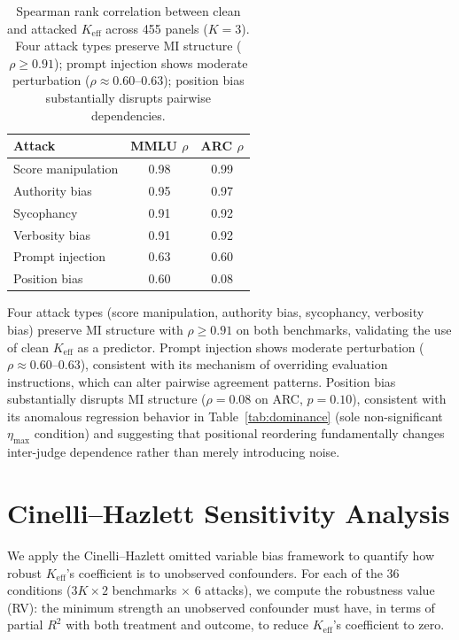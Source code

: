 \begin{table}[h]
\centering
\small
\begin{tabular}{lcc}
\toprule
\textbf{Attack} & \textbf{MMLU $\rho$} & \textbf{ARC $\rho$} \\
\midrule
Score manipulation & 0.98 & 0.99 \\
Authority bias     & 0.95 & 0.97 \\
Sycophancy         & 0.91 & 0.92 \\
Verbosity bias     & 0.91 & 0.92 \\
Prompt injection   & 0.63 & 0.60 \\
Position bias      & 0.60 & 0.08 \\
\bottomrule
\end{tabular}
\caption{Spearman rank correlation between clean and attacked $K_{\mathrm{eff}}$ across 455 panels ($K{=}3$). Four attack types preserve MI structure ($\rho{\geq}0.91$); prompt injection shows moderate perturbation ($\rho{\approx}0.60$--$0.63$); position bias substantially disrupts pairwise dependencies.}
\label{tab:attacked_keff}
\end{table}

Four attack types (score manipulation, authority bias, sycophancy, verbosity bias) preserve MI structure with $\rho{\geq}0.91$ on both benchmarks, validating the use of clean $K_{\mathrm{eff}}$ as a predictor. Prompt injection shows moderate perturbation ($\rho{\approx}0.60$--$0.63$), consistent with its mechanism of overriding evaluation instructions, which can alter pairwise agreement patterns. Position bias substantially disrupts MI structure ($\rho{=}0.08$ on ARC, $p{=}0.10$), consistent with its anomalous regression behavior in Table~\ref{tab:dominance} (sole non-significant $\eta_{\max}$ condition) and suggesting that positional reordering fundamentally changes inter-judge dependence rather than merely introducing noise.

\section{Cinelli--Hazlett Sensitivity Analysis}
\label{app:sensitivity}

We apply the Cinelli--Hazlett omitted variable bias framework to quantify how robust $K_{\mathrm{eff}}$'s coefficient is to unobserved confounders. For each of the 36 conditions ($3K \times 2$ benchmarks $\times$ $6$ attacks), we compute the robustness value (RV): the minimum strength an unobserved confounder must have, in terms of partial $R^2$ with both treatment and outcome, to reduce $K_{\mathrm{eff}}$'s coefficient to zero.

